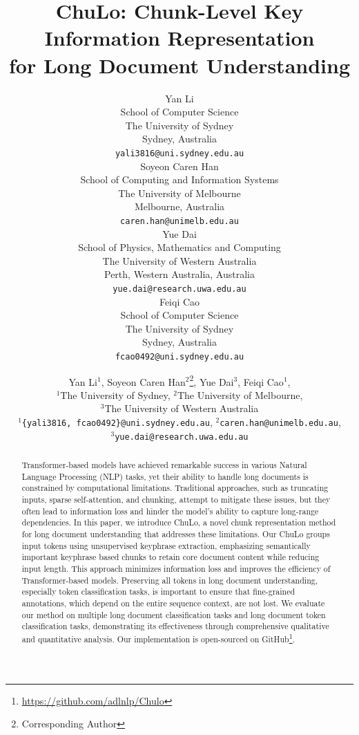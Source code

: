 \documentclass[11pt]{article}
\title{ChuLo: Chunk-Level Key Information Representation \\for Long Document Understanding}
\author{Yan Li \\
  School of Computer Science \\
  The University of Sydney \\
  Sydney, Australia \\
  \texttt{yali3816@uni.sydney.edu.au} \\
  \And
  Soyeon Caren Han \\
  School of Computing and Information Systems \\
  The University of Melbourne \\
  Melbourne, Australia\\
  \texttt{caren.han@unimelb.edu.au} \\
  \AND
  Yue Dai \\
  School of Physics, Mathematics and Computing\\
  The University of Western Australia \\
  Perth, Western Australia, Australia \\
  \texttt{yue.dai@research.uwa.edu.au} \\
  \And
  Feiqi Cao \\
  School of Computer Science \\
  The University of Sydney \\
  Sydney, Australia\\
  \texttt{fcao0492@uni.sydney.edu.au} \\
}
\author{Yan Li$^1$, Soyeon Caren Han$^2$\thanks{Corresponding Author}, Yue Dai$^3$, Feiqi Cao$^1$, \\
$^1$The University of Sydney, $^2$The University of Melbourne,\\ $^3$The University of Western Australia \\
$^1$\texttt{\{yali3816, fcao0492\}@uni.sydney.edu.au}, $^2$\texttt{caren.han@unimelb.edu.au}, \\ $^3$\texttt{yue.dai@research.uwa.edu.au}\\
}
\begin{document}
\maketitle

\begin{abstract}
Transformer-based models have achieved remarkable success in various Natural Language Processing (NLP) tasks, yet their ability to handle long documents is constrained by computational limitations. Traditional approaches, such as truncating inputs, sparse self-attention, and chunking, attempt to mitigate these issues, but they often lead to information loss and hinder the model's ability to capture long-range dependencies. In this paper, we introduce ChuLo, a novel chunk representation method for long document understanding that addresses these limitations. Our ChuLo groups input tokens using unsupervised keyphrase extraction, emphasizing semantically important keyphrase based chunks to retain core document content while reducing input length. This approach minimizes information loss and improves the efficiency of Transformer-based models. Preserving all tokens in long document understanding, especially token classification tasks, is important to ensure that fine-grained annotations, which depend on the entire sequence context, are not lost. We evaluate our method on multiple long document classification tasks and long document token classification tasks, demonstrating its effectiveness through comprehensive qualitative and quantitative analysis. Our implementation is open-sourced on GitHub\footnote{\url{https://github.com/adlnlp/Chulo}}.
\end{abstract}
\end{document}
